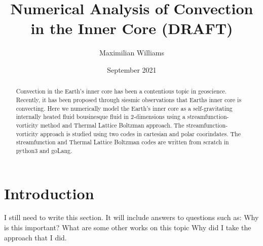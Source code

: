 \documentclass{article}
\title{Numerical Analysis of Convection in the Inner Core (DRAFT)}
\author{Maximilian Williams}
\date{September 2021}
\begin{document}
\maketitle

\begin{abstract}
	Convection in the Earth's inner core has been a contentious topic in geoscience. Recently, it has been proposed through siesmic observations that Earths inner core is convecting. Here we numerically model the Earth's inner core as a self-gravitating internally heated fluid bousinesque fluid in 2-dimensions using a streamfunction-vorticity method and Thermal Lattice Boltzman approach. The streamfunction-vorticity approach is studied using two codes in cartesian and polar coorindates. The streamfunction and Thermal Lattice Boltzman codes are written from scratch in python3 and goLang. 
 
\end{abstract}

\section*{Introduction}

I still need to write this section. It will include answers to questions such as: 
\newline
Why is this important?
\newline
What are some other works on this topic
\newline
Why did I take the approach that I did. 
\end{document}
